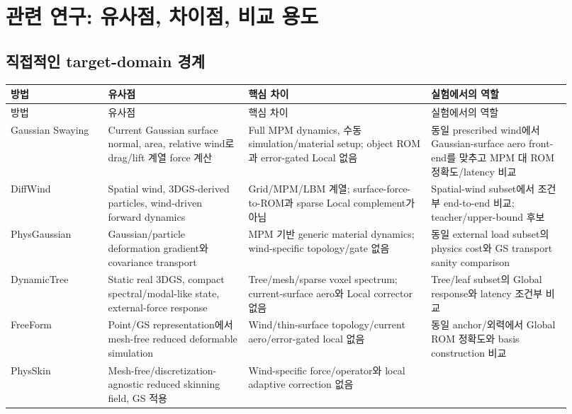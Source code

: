 \documentclass[11pt,a4paper]{article}
\begin{document}
\section{관련 연구: 유사점, 차이점, 비교 용도}

\subsection{직접적인 target-domain 경계}

\begin{longtable}{L{0.16\linewidth}L{0.23\linewidth}L{0.30\linewidth}L{0.23\linewidth}}
\toprule
방법 & 유사점 & 핵심 차이 & 실험에서의 역할 \\
\midrule
\endfirsthead
\toprule
방법 & 유사점 & 핵심 차이 & 실험에서의 역할 \\
\midrule
\endhead
Gaussian Swaying \cite{yan2026gaussianswaying}
& Current Gaussian surface normal, area, relative wind로 drag/lift 계열 force 계산
& Full MPM dynamics, 수동 simulation/material setup; object ROM과 error-gated Local 없음
& 동일 prescribed wind에서 Gaussian-surface aero front-end를 맞추고 MPM 대 ROM 정확도/latency 비교 \\
\addlinespace
DiffWind \cite{lei2026diffwind}
& Spatial wind, 3DGS-derived particles, wind-driven forward dynamics
& Grid/MPM/LBM 계열; surface-force-to-ROM과 sparse Local complement가 아님
& Spatial-wind subset에서 조건부 end-to-end 비교; teacher/upper-bound 후보 \\
\addlinespace
PhysGaussian \cite{xie2024physgaussian}
& Gaussian/particle deformation gradient와 covariance transport
& MPM 기반 generic material dynamics; wind-specific topology/gate 없음
& 동일 external load subset의 physics cost와 GS transport sanity comparison \\
\addlinespace
DynamicTree \cite{li2026dynamictree}
& Static real 3DGS, compact spectral/modal-like state, external-force response
& Tree/mesh/sparse voxel spectrum; current-surface aero와 Local corrector 없음
& Tree/leaf subset의 Global response와 latency 조건부 비교 \\
\addlinespace
FreeForm \cite{xiang2026freeform}
& Point/GS representation에서 mesh-free reduced deformable simulation
& Wind/thin-surface topology/current aero/error-gated local 없음
& 동일 anchor/외력에서 Global ROM 정확도와 basis construction 비교 \\
\addlinespace
PhysSkin \cite{lei2026physskin}
& Mesh-free/discretization-agnostic reduced skinning field, GS 적용
& Wind-specific force/operator와 local adaptive correction 없음

\end{longtable}
\end{document}
